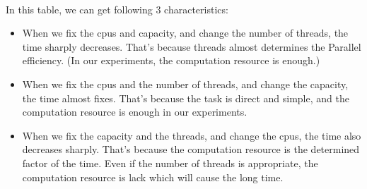 \documentclass{article}
\begin{document}
\begin{spacing}{1.1}
\\\indent In this table, we can get following $3$ characteristics:
\begin{itemize}
    \item When we fix the cpus and capacity, and change the number of threads, the time sharply decreases. That's because threads almost determines the Parallel efficiency. (In our experiments, the computation resource is enough.)
    \item When we fix the cpus and the number of threads, and change the capacity, the time almost fixes. That's because the task is direct and simple, and the computation resource is enough in our experiments.
    \item When we fix the capacity and the threads, and change the cpus, the time also decreases sharply. That's because the computation resource is the determined factor of the time. Even if the number of threads is appropriate, the computation resource is lack which will cause the long time.
\end{itemize}

\end{spacing}
\end{document}
